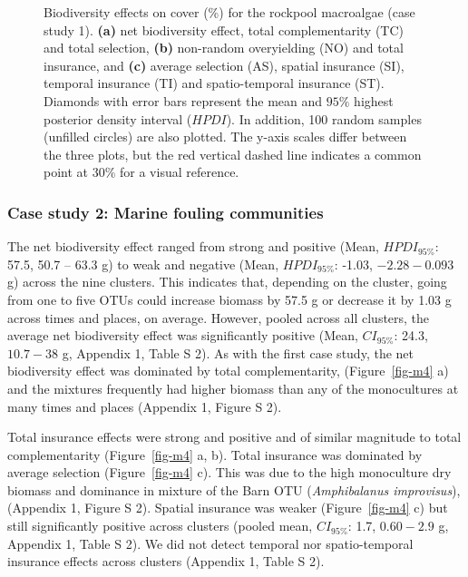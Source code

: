 \documentclass[
  letterpaper,
  DIV=11,
  numbers=noendperiod]{scrartcl}
\begin{document}
\begin{figure}


\caption{\label{fig-m3}Biodiversity effects on cover (\%) for the
rockpool macroalgae (case study 1). \textbf{(a)} net biodiversity
effect, total complementarity (TC) and total selection, \textbf{(b)}
non-random overyielding (NO) and total insurance, and \textbf{(c)}
average selection (AS), spatial insurance (SI), temporal insurance (TI)
and spatio-temporal insurance (ST). Diamonds with error bars represent
the mean and \(95\%\) highest posterior density interval (\(HPDI\)). In
addition, 100 random samples (unfilled circles) are also plotted. The
y-axis scales differ between the three plots, but the red vertical
dashed line indicates a common point at 30\% for a visual reference.}

\end{figure}%

\subsubsection{Case study 2: Marine fouling
communities}\label{case-study-2-marine-fouling-communities-1}

The net biodiversity effect ranged from strong and positive (Mean,
\(HPDI_{95\%}\): 57.5, 50.7 -- 63.3 g) to weak and negative (Mean,
\(HPDI_{95\%}\): -1.03, \(-2.28 - 0.093\) g) across the nine clusters.
This indicates that, depending on the cluster, going from one to five
OTUs could increase biomass by 57.5 g or decrease it by 1.03 g across
times and places, on average. However, pooled across all clusters, the
average net biodiversity effect was significantly positive (Mean,
\(CI_{95\%}\): 24.3, \(10.7 - 38\) g, Appendix 1, Table S 2). As with
the first case study, the net biodiversity effect was dominated by total
complementarity, (Figure~\ref{fig-m4} a) and the mixtures frequently had
higher biomass than any of the monocultures at many times and places
(Appendix 1, Figure S 2).

Total insurance effects were strong and positive and of similar
magnitude to total complementarity (Figure~\ref{fig-m4} a, b). Total
insurance was dominated by average selection (Figure~\ref{fig-m4} c).
This was due to the high monoculture dry biomass and dominance in
mixture of the Barn OTU (\emph{Amphibalanus improvisus}), (Appendix 1,
Figure S 2). Spatial insurance was weaker (Figure~\ref{fig-m4} c) but
still significantly positive across clusters (pooled mean,
\(CI_{95\%}\): 1.7, \(0.60 - 2.9\) g, Appendix 1, Table S 2). We did not
detect temporal nor spatio-temporal insurance effects across clusters
(Appendix 1, Table S 2).
\end{document}
